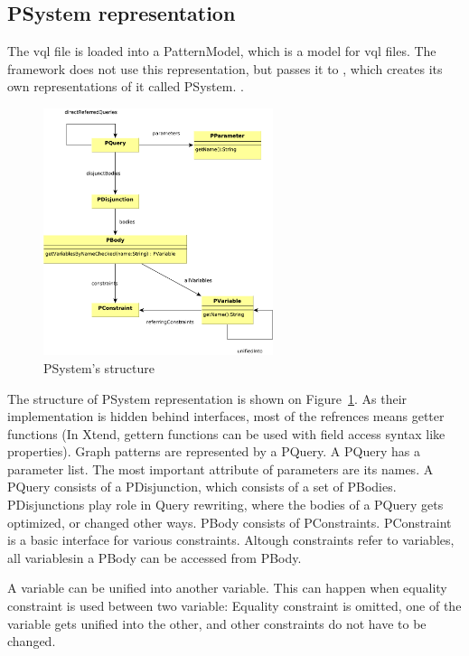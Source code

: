 \subsection{PSystem representation}


The vql file is loaded into a PatternModel, which is a model for vql files. 
The framework does not use this representation, but passes it to \viatra, which creates its own representations of it called PSystem. \cite{psystem}. 


\begin{figure}
	\begin{center}
		\includegraphics[width=0.6\textwidth]{figures/psystem.pdf}
		\caption{PSystem's structure}
		\label{fig:psystem}
	\end{center}
\end{figure}
The structure of PSystem representation is shown on Figure~\ref{fig:psystem}. 
As their implementation is hidden behind interfaces, most of the refrences means getter functions (In Xtend, gettern functions can be used with field access syntax like \csharp{} properties). 
Graph patterns are represented by a PQuery. 
A PQuery has a parameter list. 
The most important attribute of parameters are its names. 
A PQuery consists of a PDisjunction, which consists of a set of PBodies. 
PDisjunctions play role in Query rewriting, where the bodies of a PQuery gets optimized, or changed other ways.
PBody consists of PConstraints. 
PConstraint is a basic interface for various constraints. 
Altough constraints refer to variables, all variablesin a PBody can be accessed from PBody.

A variable can be unified into another variable. 
This can happen when equality constraint is used between two variable: 
Equality constraint is omitted, one of the variable gets unified into the other, and other constraints do not have to be changed.

